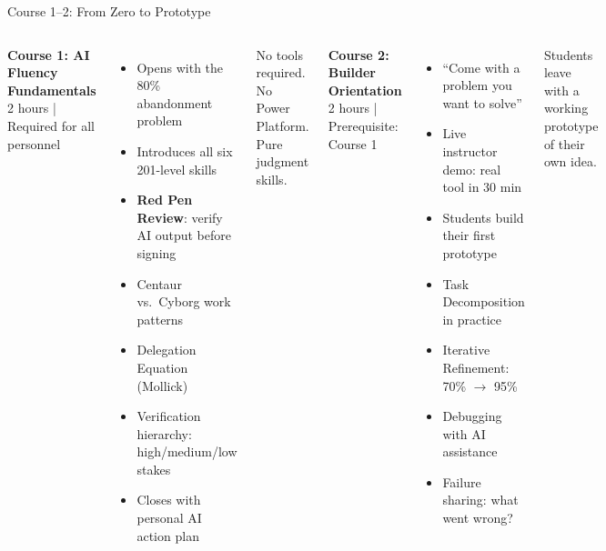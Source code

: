 \documentclass[aspectratio=169,11pt]{beamer}
\newcommand{\hl}[1]{\textbf{\color{scarlet}#1}}
\newcommand{\navy}[1]{\textbf{\color{navyblue}#1}}
\begin{document}
\begin{frame}[shrink=5]{Course 1--2: From Zero to Prototype}

\begin{columns}[T]

\navy{\faGraduationCap\quad Course 1: AI Fluency Fundamentals}\\
{\small 2 hours | Required for all personnel}

\vspace{4pt}

\begin{itemize}\small
  \item Opens with the 80\% abandonment problem
  \item Introduces all six 201-level skills
  \item \hl{Red Pen Review}: verify AI output before signing
  \item Centaur vs.\ Cyborg work patterns
  \item Delegation Equation (Mollick)
  \item Verification hierarchy: high/medium/low stakes
  \item Closes with personal AI action plan
\end{itemize}

\vspace{4pt}
{\footnotesize\color{dodgreen}\faCheckCircle\quad No tools required. No Power Platform. Pure judgment skills.}


\navy{\faTools\quad Course 2: Builder Orientation}\\
{\small 2 hours | Prerequisite: Course 1}

\vspace{4pt}

\begin{itemize}\small
  \item ``Come with a problem you want to solve''
  \item Live instructor demo: real tool in 30 min
  \item Students build their first prototype
  \item Task Decomposition in practice
  \item Iterative Refinement: 70\% $\to$ 95\%
  \item Debugging with AI assistance
  \item Failure sharing: what went wrong?
\end{itemize}

\vspace{4pt}
{\footnotesize\color{dodgreen}\faCheckCircle\quad Students leave with a working prototype of their own idea.}
\end{columns}

\end{frame}
\end{document}
